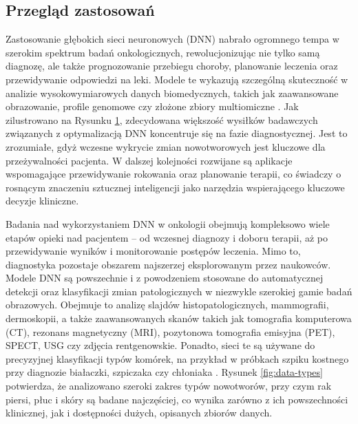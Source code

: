 \subsection{Przegląd zastosowań}

Zastosowanie głębokich sieci neuronowych (DNN) nabrało ogromnego tempa w szerokim spektrum badań onkologicznych, rewolucjonizując nie tylko samą diagnozę, ale także prognozowanie przebiegu choroby, planowanie leczenia oraz przewidywanie odpowiedzi na leki. Modele te wykazują szczególną skuteczność w analizie wysokowymiarowych danych biomedycznych, takich jak zaawansowane obrazowanie, profile genomowe czy złożone zbiory multiomiczne \cite{LL1, GG2}. Jak zilustrowano na Rysunku \ref{fig:care-stages}, zdecydowana większość wysiłków badawczych związanych z optymalizacją DNN koncentruje się na fazie diagnostycznej. Jest to zrozumiałe, gdyż wczesne wykrycie zmian nowotworowych jest kluczowe dla przeżywalności pacjenta. W dalszej kolejności rozwijane są aplikacje wspomagające przewidywanie rokowania oraz planowanie terapii, co świadczy o rosnącym znaczeniu sztucznej inteligencji jako narzędzia wspierającego kluczowe decyzje kliniczne.


\begin{figure}
    \centering
    
\label{fig:care-stages}

\end{figure}

Badania nad wykorzystaniem DNN w onkologii obejmują kompleksowo wiele etapów opieki nad pacjentem – od wczesnej diagnozy i doboru terapii, aż po przewidywanie wyników i monitorowanie postępów leczenia. Mimo to, diagnostyka pozostaje obszarem najszerzej eksplorowanym przez naukowców. Modele DNN są powszechnie i z powodzeniem stosowane do automatycznej detekcji oraz klasyfikacji zmian patologicznych w niezwykle szerokiej gamie badań obrazowych. Obejmuje to analizę slajdów histopatologicznych, mammografii, dermoskopii, a także zaawansowanych skanów takich jak tomografia komputerowa (CT), rezonans magnetyczny (MRI), pozytonowa tomografia emisyjna (PET), SPECT, USG czy zdjęcia rentgenowskie. Ponadto, sieci te są używane do precyzyjnej klasyfikacji typów komórek, na przykład w próbkach szpiku kostnego przy diagnozie białaczki, szpiczaka czy chłoniaka \cite{EE1, UU1, DD1}. Rysunek \ref{fig:data-types} potwierdza, że analizowano szeroki zakres typów nowotworów, przy czym rak piersi, płuc i skóry są badane najczęściej, co wynika zarówno z ich powszechności klinicznej, jak i dostępności dużych, opisanych zbiorów danych.

